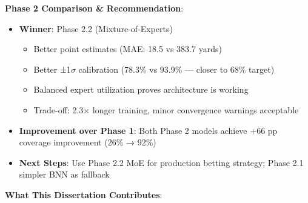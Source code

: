 \textbf{Phase 2 Comparison \& Recommendation}:
\begin{itemize}
  \item \textbf{Winner}: Phase 2.2 (Mixture-of-Experts)
  \begin{itemize}
    \item Better point estimates (MAE: 18.5 vs 383.7 yards)
    \item Better ±1$\sigma$ calibration (78.3\% vs 93.9\% — closer to 68\% target)
    \item Balanced expert utilization proves architecture is working
    \item Trade-off: 2.3× longer training, minor convergence warnings acceptable
  \end{itemize}
  \item \textbf{Improvement over Phase 1}: Both Phase 2 models achieve +66 pp coverage improvement (26\% → 92\%)
  \item \textbf{Next Steps}: Use Phase 2.2 MoE for production betting strategy; Phase 2.1 simpler BNN as fallback
\end{itemize}


\textbf{What This Dissertation Contributes}:

